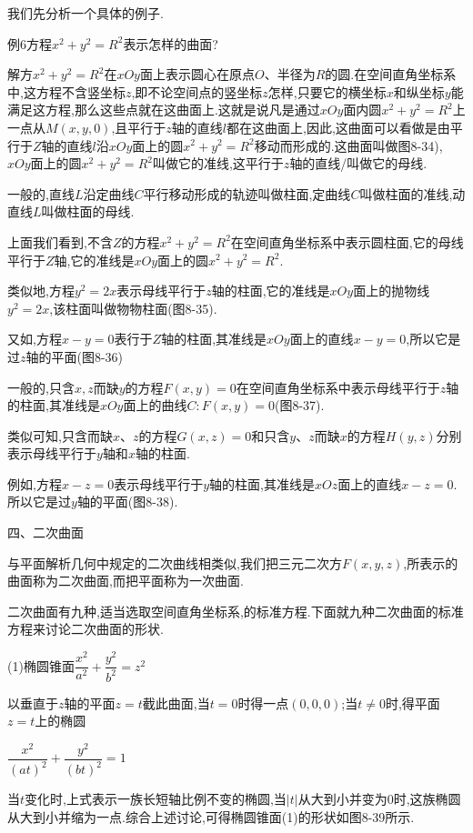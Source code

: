 \documentclass[oneside]{book}
\begin{document}
我们先分析一个具体的例子.

例6方程${x^2} + {y^2} = {R^2}$表示怎样的曲面?

解方${x^2} + {y^2} = {R^2}$在$xOy$面上表示圆心在原点$O$、半径为$R$的圆.在空间直角坐标系中,这方程不含竖坐标$z$,即不论空间点的竖坐标$z$怎样,只要它的横坐标$x$和纵坐标$y$能满足这方程,那么这些点就在这曲面上.这就是说凡是通过$xOy$面内圆${x^2} + {y^2} = {R^2}$上一点从$M(x,y,0)$,且平行于$z$轴的直线$l$都在这曲面上,因此,这曲面可以看做是由平行于$Z$轴的直线$l$沿$xOy$面上的圆${x^2} + {y^2} = {R^2}$移动而形成的.这曲面叫做图8-34),$xOy$面上的圆${x^2} + {y^2} = {R^2}$叫做它的准线,这平行于$z$轴的直线/叫做它的母线.

一般的,直线$L$沿定曲线$C$平行移动形成的轨迹叫做柱面,定曲线$C$叫做柱面的准线,动直线$L$叫做柱面的母线.

上面我们看到,不含$Z$的方程${x^2} + {y^2} = {R^2}$在空间直角坐标系中表示圆柱面,它的母线平行于$Z$轴,它的准线是$xOy$面上的圆${x^2} + {y^2} = {R^2}$.

类似地,方程${y^2} = 2x$表示母线平行于$z$轴的柱面,它的准线是$xOy$面上的抛物线${y^2} = 2x$,该柱面叫做物物柱面(图8-35).

又如,方程$x-y=0$表行于$Z$轴的柱面,其准线是$xOy$面上的直线$x-y=0$,所以它是过$z$轴的平面(图8-36)

一般的,只含$x,z$而缺$y$的方程$F(x,y) = 0$在空间直角坐标系中表示母线平行于$z$轴的柱面,其准线是$xOy$面上的曲线$C:F(x,y)=0$(图8-37).

类似可知,只含而缺$x$、$z$的方程$G(x,z) = 0$和只含$y$、$z$而缺$x$的方程$H(y,z)$分别表示母线平行于$y$轴和$x$轴的柱面.

例如,方程$x - z = 0$表示母线平行于$y$轴的柱面,其准线是$xOz$面上的直线$x - z = 0$.所以它是过$y$轴的平面(图8-38).

四、二次曲面

与平面解析几何中规定的二次曲线相类似,我们把三元二次方$F(x,y,z)$,所表示的曲面称为二次曲面,而把平面称为一次曲面.

二次曲面有九种,适当选取空间直角坐标系,的标准方程.下面就九种二次曲面的标准方程来讨论二次曲面的形状.

(1)椭圆锥面$\dfrac{{{x^2}}}{{{a^2}}} + \dfrac{{{y^2}}}{{{b^2}}} = {z^2}$

以垂直于$z$轴的平面$z=t$截此曲面,当$t=0$时得一点$(0,0,0)$;当$t \ne 0$时,得平面$z=t$上的椭圆

$\dfrac{{{x^2}}}{{{{(at)}^2}}} + \dfrac{{{y^2}}}{{{{(bt)}^2}}} = 1$

当$t$变化时,上式表示一族长短轴比例不变的椭圆,当$|t|$从大到小并变为0时,这族椭圆从大到小并缩为一点.综合上述讨论,可得椭圆锥面(1)的形状如图8-39所示.
\end{document}
